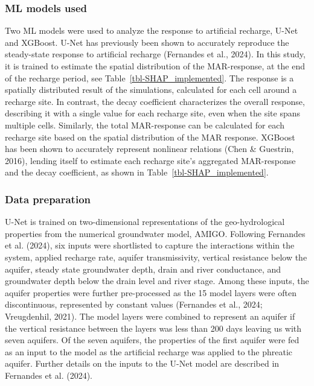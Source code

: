\documentclass[
]{agujournal2019}
\begin{document}
\subsubsection{ML models used}\label{ml-models-used}

Two ML models were used to analyze the response to artificial recharge,
U-Net and XGBoost. U-Net has previously been shown to accurately
reproduce the steady-state response to artificial recharge (Fernandes et
al., 2024). In this study, it is trained to estimate the spatial
distribution of the MAR-response, at the end of the recharge period, see
Table~\ref{tbl-SHAP_implemented}. The response is a spatially
distributed result of the simulations, calculated for each cell around a
recharge site. In contrast, the decay coefficient characterizes the
overall response, describing it with a single value for each recharge
site, even when the site spans multiple cells. Similarly, the total
MAR-response can be calculated for each recharge site based on the
spatial distribution of the MAR response. XGBoost has been shown to
accurately represent nonlinear relations (Chen \& Guestrin, 2016),
lending itself to estimate each recharge site's aggregated MAR-response
and the decay coefficient, as shown in Table~\ref{tbl-SHAP_implemented}.

\subsubsection{Data preparation}\label{sec-data-preparation}

U-Net is trained on two-dimensional representations of the
geo-hydrological properties from the numerical groundwater model, AMIGO.
Following Fernandes et al. (2024), six inputs were shortlisted to
capture the interactions within the system, applied recharge rate,
aquifer transmissivity, vertical resistance below the aquifer, steady
state groundwater depth, drain and river conductance, and groundwater
depth below the drain level and river stage. Among these inputs, the
aquifer properties were further pre-processed as the 15 model layers
were often discontinuous, represented by constant values (Fernandes et
al., 2024; Vreugdenhil, 2021). The model layers were combined to
represent an aquifer if the vertical resistance between the layers was
less than 200 days leaving us with seven aquifers. Of the seven
aquifers, the properties of the first aquifer were fed as an input to
the model as the artificial recharge was applied to the phreatic
aquifer. Further details on the inputs to the U-Net model are described
in Fernandes et al. (2024).
\end{document}
